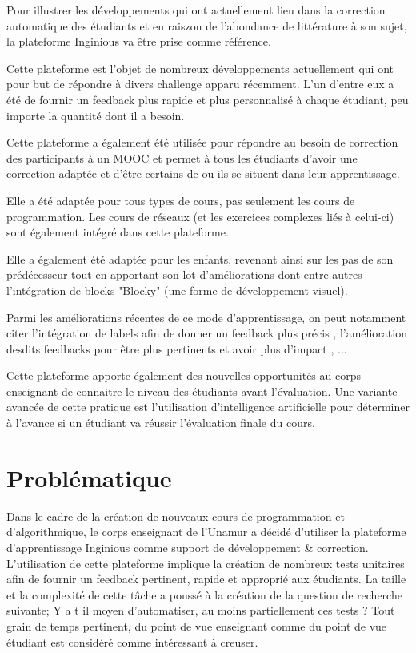 \documentclass[a4paper]{report}
\begin{document}
Pour illustrer les développements qui ont actuellement lieu dans la correction automatique des étudiants et en raiszon de l'abondance de littérature à son sujet, la plateforme Inginious va être prise comme référence.

Cette plateforme est l'objet de nombreux développements actuellement qui ont pour but de répondre à divers challenge apparu récemment.
L'un d'entre eux a été de fournir un feedback plus rapide et plus personnalisé à chaque étudiant, peu importe la quantité dont il a besoin\cite{Staubitz2017}.

Cette plateforme a également été utilisée pour répondre au besoin de correction des participants à un MOOC et permet à tous les étudiants d'avoir une correction adaptée et d'être certains de ou ils se situent dans leur apprentissage\cite{derval2015automatic}.

Elle a été adaptée pour tous types de cours, pas seulement les cours de programmation.
Les cours de réseaux (et les exercices complexes liés à celui-ci) sont également intégré dans cette plateforme\cite{Bonaventure2020}.

Elle a également été adaptée pour les enfants, revenant ainsi sur les pas de son prédécesseur tout en apportant son lot d'améliorations\cite{Thuin} dont entre autres l'intégration de blocks "Blocky" (une forme de développement visuel).

Parmi les améliorations récentes de ce mode d'apprentissage, on peut notamment citer l'intégration de labels afin de donner un feedback plus précis \cite{Martin}, l'amélioration desdits feedbacks pour être plus pertinents et avoir plus d'impact \cite{Derval2022}, ...

Cette plateforme apporte également des nouvelles opportunités au corps enseignant de connaitre le niveau des étudiants avant l'évaluation.
Une variante avancée de cette pratique est l'utilisation d'intelligence artificielle pour déterminer à l'avance si un étudiant va réussir l'évaluation finale du cours\cite{Hormaux}.


\chapter{Problématique}

Dans le cadre de la création de nouveaux cours de programmation et d'algorithmique, le corps enseignant de l’Unamur a décidé d'utiliser la plateforme d'apprentissage Inginious comme support de développement \& correction.
L'utilisation de cette plateforme implique la création de nombreux tests unitaires afin de fournir un feedback pertinent, rapide et approprié aux étudiants.
La taille et la complexité de cette tâche a poussé à la création de la question de recherche suivante; Y a t il moyen d'automatiser, au moins partiellement ces tests ?
Tout grain de temps pertinent, du point de vue enseignant comme du point de vue étudiant est considéré comme intéressant à creuser.
\end{document}
